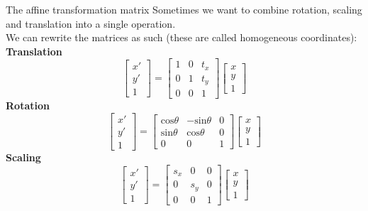 \documentclass[9pt, aspectratio=169]{beamer}
\begin{document}
\begin{frame}
    {The affine transformation matrix}
    Sometimes we want to combine rotation, scaling and translation into a single operation.\\
    We can rewrite the matrices as such (these are called homogeneous coordinates):\\

    \centering
    \textbf{Translation}
    $$\begin{bmatrix}x'\\y'\\1\end{bmatrix} = \begin{bmatrix}1&0&t_x\\0&1&t_y\\0&0&1\end{bmatrix}\begin{bmatrix}x\\y\\1\end{bmatrix}$$
    \textbf{Rotation}
    $$\begin{bmatrix}x'\\y'\\1\end{bmatrix} = \begin{bmatrix}\text{cos}\theta&-\text{sin}\theta&0\\\text{sin}\theta&\text{cos}\theta&0\\0&0&1\end{bmatrix}\begin{bmatrix}x\\y\\1\end{bmatrix}$$
    \textbf{Scaling}
    $$\begin{bmatrix}x'\\y'\\1\end{bmatrix} = \begin{bmatrix}s_x&0&0\\0&s_y&0\\0&0&1\end{bmatrix}\begin{bmatrix}x\\y\\1\end{bmatrix}$$
\end{frame}
\end{document}
